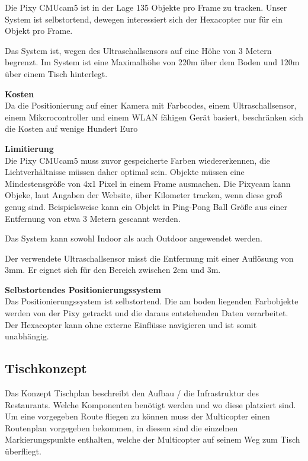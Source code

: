 \begin{itemize}
      Die Pixy CMUcam5 ist in der Lage 135 Objekte pro Frame zu tracken. Unser System ist selbstortend, dewegen interessiert sich der Hexacopter nur für ein Objekt pro Frame. \cite{PIXY_Porting_Examplecode}

      Das System ist, wegen des Ultraschallsensors auf eine Höhe von 3 Metern begrenzt. Im System ist eine Maximalhöhe von 220m über dem Boden und 120m über einem Tisch hinterlegt.

      \textbf{Kosten}\\
      Da  die Positionierung auf einer Kamera mit Farbcodes, einem Ultraschallsensor, einem Mikcrocontroller und einem WLAN fähigen Gerät basiert, beschränken sich die Kosten auf wenige Hundert Euro

      \textbf{Limitierung}\\
      Die Pixy CMUcam5 muss zuvor gespeicherte Farben wiedererkennen, die Lichtverhältnisse müssen daher optimal sein.  
      Objekte müssen eine Mindestensgröße von 4x1 Pixel in einem Frame ausmachen. Die Pixycam kann Objeke, laut Angaben der Website, über Kilometer tracken, wenn diese groß genug sind. Beispielsweise kann ein Objekt in Ping-Pong Ball Größe aus einer Entfernung von etwa 3 Metern gescannt werden. 
      \cite{Pixy}

      Das System kann sowohl Indoor als auch Outdoor angewendet werden.

      Der verwendete Ultraschallsensor misst die Entfernung mit einer Auflösung von 3mm. Er eignet sich für den Bereich zwischen 2cm und 3m. 
      \cite{Ultrasonic}

      \textbf{Selbstortendes Positionierungssystem}\\
      Das Positionierungssystem ist selbstortend. Die am boden liegenden Farbobjekte werden von der Pixy getrackt und die daraus entstehenden Daten verarbeitet. Der Hexacopter kann ohne externe Einflüsse navigieren und ist somit unabhängig.


  \subsection{Tischkonzept}

  Das Konzept Tischplan beschreibt den Aufbau / die Infrastruktur des Restaurants. Welche Komponenten benötigt werden und wo diese platziert sind.
  Um eine vorgegeben Route fliegen zu können muss der Multicopter einen Routenplan vorgegeben bekommen, in diesem sind die einzelnen Markierungspunkte enthalten, welche der Multicopter auf seinem Weg zum Tisch überfliegt.


\end{itemize}
